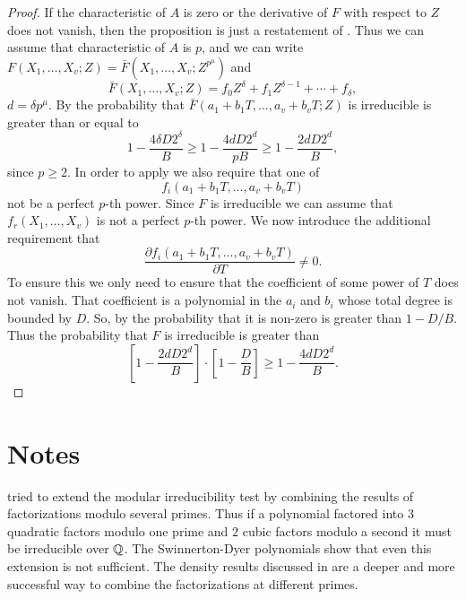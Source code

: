 \begin{proof}
If the characteristic of $A$ is zero or the derivative of $F$ with respect
to $Z$ does not vanish, then the proposition is just a
restatement of .  Thus we can assume that 
characteristic of $A$ is $p$, and we can write $F(X_1, \ldots, X_v; Z)
= \bar{F}(X_1, \ldots, X_v; Z^{p^{\mu}})$ and
\[
\bar{F}(X_1, \ldots, X_v; Z) = f_0 Z^{\delta} 
    + f_1 Z^{\delta-1} + \cdots + f_{\delta},
\]
$d = \delta p^{\mu}$.  By 
the probability that $\bar{F}(a_1+b_1T, \ldots, a_v+b_vT; Z)$ is
irreducible is greater than or equal to
\[
1 - \frac{4 \delta D 2^{\delta}}{B} \ge 1 - \frac{4d D 2^{d}}{pB}
\ge 1 - \frac{2dD2^d}{B},
\]
since $p \ge 2$.  In order to apply  we also
require that one of
\[
f_i(a_1 + b_1T, \ldots, a_v + b_vT)
\]
not be a perfect $p$-th power.  Since $F$ is irreducible we can
assume that $f_r(X_1, \ldots, X_v)$ is not a perfect $p$-th power.
We now introduce the additional requirement that
\[
\frac{\partial f_i(a_1 + b_1T, \ldots, a_v + b_vT)}{\partial T} \not =
0.
\]
To ensure this we only need to ensure that the coefficient of some
power of $T$ does not vanish.  That coefficient is a polynomial in the
$a_i$ and $b_i$ whose total degree is bounded by $D$.  So, by
 the probability that it is non-zero is
greater than $1 - D/B$.  Thus the probability that $F$ is irreducible
is greater than
\[
\left[1 - \frac{2dD2^d}{B}\right] \cdot
\left[1 - \frac{D}{B} \right] \ge
 1 - \frac{4dD2^d}{B}.
\]
\end{proof}


\section*{Notes}

\small

{\Musser} \cite{Musser1978-ez} tried to extend the modular irreducibility
test by combining the results of factorizations modulo several primes.
Thus if a polynomial factored into $3$ quadratic factors modulo one
prime and $2$ cubic factors modulo a second it must be irreducible
over $\mathbb{Q}$.  The Swinnerton-Dyer
polynomials show that even this
extension is not sufficient.  The density results discussed in
 are a deeper and more successful way to combine
the factorizations at different primes.

